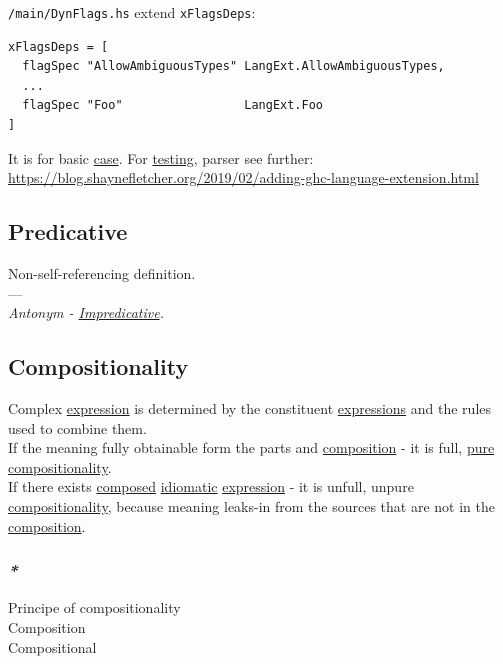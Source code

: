 \documentclass[11pt]{article}
\begin{document}
\texttt{/main/DynFlags.hs} extend \texttt{xFlagsDeps}:\\
\begin{verbatim}
xFlagsDeps = [
  flagSpec "AllowAmbiguousTypes" LangExt.AllowAmbiguousTypes,
  ...
  flagSpec "Foo"                 LangExt.Foo
]
\end{verbatim}
It is for basic \hyperref[org41d12b6]{case}. For \hyperref[org8d1ff3f]{testing}, parser see further: \url{https://blog.shaynefletcher.org/2019/02/adding-ghc-language-extension.html}\\

\subsection{\label{org7b6223b}Predicative}
\label{sec:orgb181c22}
Non-self-referencing definition.\\

---\\

\emph{Antonym - \hyperref[org989a83a]{Impredicative}.}\\

\subsection{\label{orgd6cba3d}Compositionality}
\label{sec:orgddaf15a}
Complex \hyperref[org9021dd7]{expression} is determined by the constituent \hyperref[org3731c99]{expressions} and the rules used to combine them.\\

If the meaning fully obtainable form the parts and \hyperref[orga128e7f]{composition} - it is full, \hyperref[org1bf8e16]{pure} \hyperref[orgd6cba3d]{compositionality}.\\

If there exists \hyperref[orgc78ac5d]{composed} \hyperref[orgcf367d9]{idiomatic} \hyperref[org9021dd7]{expression} - it is unfull, unpure \hyperref[orgd6cba3d]{compositionality}, because meaning leaks-in from the sources that are not in the \hyperref[orga128e7f]{composition}.\\

\subsubsection{\emph{*}}
\label{sec:org8e497d1}

\label{org51d7e67}Principe of compositionality\\
\label{org76c0a5f}Composition\\
\label{org42474b1}Compositional\\
\end{document}
